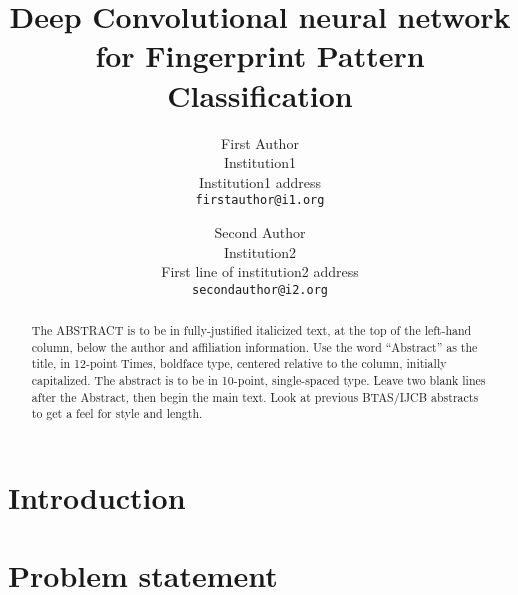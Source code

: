 \documentclass[10pt,twocolumn,letterpaper]{article}
\begin{document}
\title{Deep Convolutional neural network for Fingerprint Pattern Classification}

\author{First Author\\
Institution1\\
Institution1 address\\
{\tt\small firstauthor@i1.org}
\and
Second Author\\
Institution2\\
First line of institution2 address\\
{\tt\small secondauthor@i2.org}
}

\maketitle
\thispagestyle{empty}

\begin{abstract}
   The ABSTRACT is to be in fully-justified italicized text, at the top
   of the left-hand column, below the author and affiliation
   information. Use the word ``Abstract'' as the title, in 12-point
   Times, boldface type, centered relative to the column, initially
   capitalized. The abstract is to be in 10-point, single-spaced type.
   Leave two blank lines after the Abstract, then begin the main text.
   Look at previous BTAS/IJCB abstracts to get a feel for style and length.
\end{abstract}

\section{Introduction}




%

\section{Problem statement}

\end{document}
